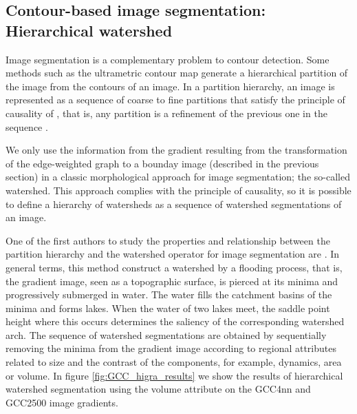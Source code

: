 \subsection{Contour-based image segmentation: Hierarchical watershed}

Image segmentation is a complementary problem to contour detection. Some methods such as the ultrametric contour map generate a hierarchical partition of the image from the contours of an image. In a partition hierarchy, an image is represented as a sequence of coarse to fine partitions that satisfy the principle of causality of \cite{Koenderink:BC:1984}, that is, any partition is a refinement of the previous one in the sequence \citep{Perret.Cousty.ea:TIP:2018}.

We only use the information from the gradient resulting from the transformation of the edge-weighted graph to a bounday image (described in the previous section) in a classic morphological approach for image segmentation; the so-called watershed. This approach complies with the principle of causality, so it is possible to define a hierarchy of watersheds as a sequence of watershed segmentations of an image.

One of the first authors to study the properties and relationship between the partition hierarchy and the watershed operator for image segmentation are \citep{Najman.Schmitt:PAMI:1996}. In general terms, this method construct a watershed by a flooding process, that is, the gradient image, seen as a topographic surface, is pierced at its minima and progressively submerged in water. The water fills the catchment basins of the minima and forms lakes. When the water of two lakes meet, the saddle point height where this occurs determines the saliency of the corresponding watershed arch. The sequence of watershed segmentations are obtained by sequentially removing the minima from the gradient image according to regional attributes related to size and the contrast of the components, for example, dynamics, area or volume. In figure \ref{fig:GCC_higra_results} we show the results of hierarchical watershed segmentation using the volume attribute on the GCC4nn and GCC2500 image gradients.

